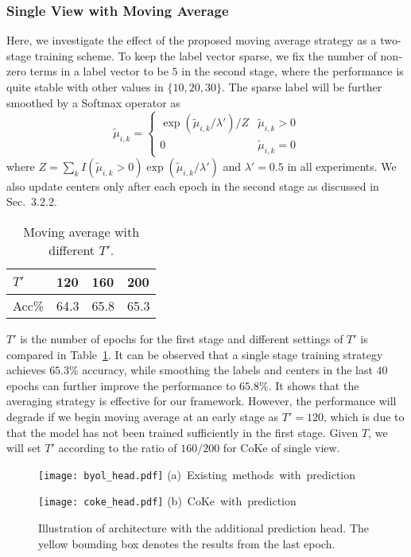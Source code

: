 \documentclass[10pt,twocolumn,letterpaper]{article}
\begin{document}
\subsubsection{Single View with Moving Average}
Here, we investigate the effect of the proposed moving average strategy as a two-stage training scheme. To keep the label vector sparse, we fix the number of non-zero terms in a label vector to be $5$ in the second stage, where the performance is quite stable with other values in $\{10,20,30\}$. The sparse label will be further smoothed by a Softmax operator as 
\[\tilde{\mu}_{i,k} = \left\{\begin{array}{cc}\exp(\tilde{\mu}_{i,k}/\lambda')/Z&\tilde{\mu}_{i,k}>0\\0&\tilde{\mu}_{i,k}=0\end{array}\right.\]
where $Z = \sum_k I(\tilde{\mu}_{i,k}>0)\exp(\tilde{\mu}_{i,k}/\lambda')$ and $\lambda'=0.5$ in all experiments. We also update centers only after each epoch in the second stage as discussed in Sec.~3.2.2.

\begin{table}[!ht]
\centering
\begin{tabular}{|l|l|l|l|}\hline
$T'$&120&160&200\\\hline
Acc\% &64.3&65.8&65.3 \\\hline
\end{tabular}
\caption{Moving average with different $T'$.}\label{tas:twostage}
\end{table}

$T'$ is the number of epochs for the first stage and different settings of $T'$ is compared in Table~\ref{tas:twostage}. It can be observed that a single stage training strategy achieves $65.3\%$ accuracy, while smoothing the labels and centers in the last $40$ epochs can further improve the performance to $65.8\%$. It shows that the averaging strategy is effective for our framework. However, the performance will degrade if we begin moving average at an early stage as $T'=120$, which is due to that the model has not been trained sufficiently in the first stage. Given $T$, we will set $T'$ according to the ratio of $160/200$ for CoKe of single view.

\begin{figure*}[!ht]
\centering
\begin{minipage}{0.45\linewidth}
\centering
\texttt{[image: byol\_head.pdf]}
\mbox{\footnotesize (a) Existing methods with prediction}
\end{minipage}
\begin{minipage}{0.45\linewidth}
\centering
\texttt{[image: coke\_head.pdf]}
\mbox{\footnotesize (b) CoKe with prediction}
\end{minipage}
\caption{Illustration of architecture with the additional prediction head. The yellow bounding box denotes the results from the last epoch.}\label{figs:pred}
\end{figure*}
\end{document}

